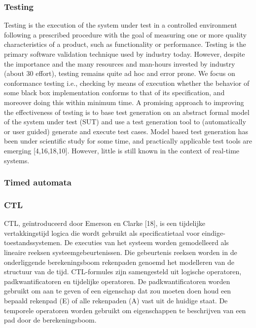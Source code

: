\documentclass{article}
\begin{document}
		\subsubsection{Testing}
		Testing is the execution of the system under test in a controlled environment following
		a prescribed procedure with the goal of measuring one or more quality characteristics
		of a product, such as functionality or performance. Testing is the primary software
		validation technique used by industry today. However, despite the importance and the
		many resources and man-hours invested by industry (about 30%
		effort), testing remains quite ad hoc and error prone.
		We focus on conformance testing i.e., checking by means of execution whether the
		behavior of some black box implementation conforms to that of its specification, and
		moreover doing this within minimum time. A promising approach to improving the
		effectiveness of testing is to base test generation on an abstract formal model of the
		system under test (SUT) and use a test generation tool to (automatically or user guided)
		generate and execute test cases. Model based test generation has been under scientific
		study for some time, and practically applicable test tools are emerging [4,16,18,10].
		However, little is still known in the context of real-time systems.
		
		\subsubsection{Timed automata}
	\subsubsection{CTL}
	
	CTL, geïntroduceerd door Emerson en Clarke [18], is een tijdelijke vertakkingstijd
	logica die wordt gebruikt als specificatietaal voor eindige-toestandssystemen. De executies
	van het systeem worden gemodelleerd als lineaire reeksen systeemgebeurtenissen. Die gebeurtenis
	reeksen worden in de onderliggende berekeningsboom rekenpaden genoemd
	het modelleren van de structuur van de tijd.
	CTL-formules zijn samengesteld uit logische operatoren, padkwantificatoren en
	tijdelijke operatoren. De padkwantificatoren worden gebruikt om aan te geven of een eigenschap dat zou moeten doen
	houd een bepaald rekenpad (E) of alle rekenpaden (A) vast
	uit de huidige staat. De temporele operatoren worden gebruikt om eigenschappen te beschrijven
	van een pad door de berekeningsboom.
	
\end{document}
